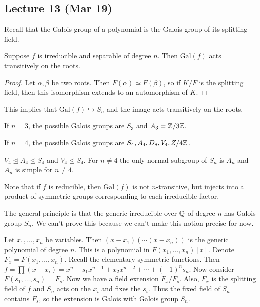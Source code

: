 \documentclass[10pt, twoside]{article}
\begin{document}
        \subsection{Lecture 13 (Mar 19)} Recall that the Galois group of a
        polynomial is the Galois group of its splitting field.

        \begin{prop} Suppose $f$ is irreducible and separable of degree $n$.
            Then $\mathrm{Gal}(f)$ acts transitively on the roots.
            \begin{proof} Let $\alpha, \beta$ be two roots. Then $F(\alpha)
                \simeq F(\beta)$, so if $K/F$ is the splitting field, then this
                isomorphism extends to an automorphism of $K$.  \end{proof}
            \end{prop}

        This implies that $\mathrm{Gal}(f) \hookrightarrow S_n$ and the image
        acts transitively on the roots.

        \begin{exm} If $n=3$, the possible Galois groups are $S_3$ and $A_3 =
            \mathbb{Z}/3\mathbb{Z}$.

            If $n=4$, the possible Galois groups are $S_4, A_4, D_8, V_4,
        Z/4\mathbb{Z}$.  \end{exm}

        \begin{rmk} $V_4 \trianglelefteq A_4 \trianglelefteq S_4$ and $V_4
        \trianglelefteq S_4$. For $n \neq 4$ the only normal subgroup of $S_n$
    is $A_n$ and $A_n$ is simple for $n \neq 4$.  \end{rmk}

        Note that if $f$ is reducible, then $\mathrm{Gal}(f)$ is not
        $n$-transitive, but injects into a product of symmetric groups
        corresponding to each irreducible factor.

        The general principle is that the generic irreducible over $\mathbb{Q}$ of
        degree $n$ has Galois group $S_n$. We can't prove this because we can't
        make this notion precise for now.

        Let $x_1, \ldots, x_n$ be variables. Then $(x-x_1)(\cdots (x-x_n))$ is
        the generic polynomial of degree $n$. This is a polynomial in $F(x_1,
        \ldots, x_n)[x]$. Denote $F_x = F(x_1, \ldots, x_n)$. Recall the
        elementary symmetric functions. Then $f = \prod (x-x_i) = x^n - s_1
        x^{n-1} + x_2x^{n-2} + \cdots + (-1)^n s_n$. Now consider $F(s_1,
        \ldots, s_n) = F_s$. Now we have a field extension $F_x/F_s$. Also,
        $F_x$ is the splitting field of $f$ and $S_n$ acts on the $x_i$ and
        fixes the $s_i$. Thus the fixed field of $S_n$ contains $F_s$, so the
        extension is Galois with Galois group $S_n$.
\end{document}
